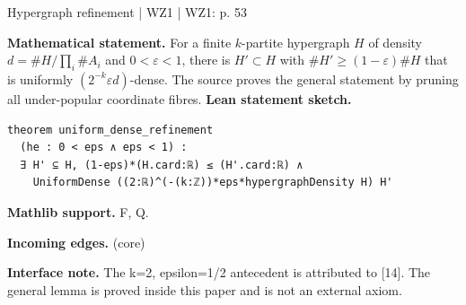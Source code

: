 \documentclass[10pt,a4paper]{article}
\newcommand{\nodecard}[1]{\hyperlink{node-#1}{\texttt{\detokenize{#1}}}}
\begin{document}
\begin{minipage}{\linewidth}
\hypertarget{node-L8_1}{}
\begin{tcolorbox}[colback=white,colframe=radialfg,colbacktitle=radialbg,coltitle=ink,boxrule=0.45pt,arc=1.6mm,left=3mm,right=3mm,top=2mm,bottom=2mm,title={\sffamily\bfseries WZ1 Lemma 8.1 \hfill \texttt{L8\_1}}]
{\sffamily\small\color{muted}Hypergraph refinement | WZ1 | WZ1: p. 53}\par
\textbf{Mathematical statement.} For a finite $k$-partite hypergraph $H$ of density $d=\#H/\prod_i\#A_i$ and $0<\varepsilon<1$, there is $H'\subset H$ with
$\#H'\ge(1-\varepsilon)\#H$ that is uniformly $(2^{-k}\varepsilon d)$-dense.
The source proves the general statement by pruning all under-popular coordinate fibres.
\smallskip\textbf{Lean statement sketch.}
\begin{Verbatim}[fontsize=\small,breaklines=true,breakanywhere=true,tabsize=2]
theorem uniform_dense_refinement
  (he : 0 < eps ∧ eps < 1) :
  ∃ H' ⊆ H, (1-eps)*(H.card:ℝ) ≤ (H'.card:ℝ) ∧
    UniformDense ((2:ℝ)^(-(k:ℤ))*eps*hypergraphDensity H) H'
\end{Verbatim}
{\footnotesize\textbf{Mathlib support.} F, Q.\par
\textbf{Incoming edges.} \nodecard{Dhyp} (core)\par}
{\footnotesize\textbf{Interface note.} The k=2, epsilon=1/2 antecedent is attributed to [14]. The general lemma is proved inside this paper and is not an external axiom.}
\end{tcolorbox}\end{minipage}\par\medskip
\end{document}
